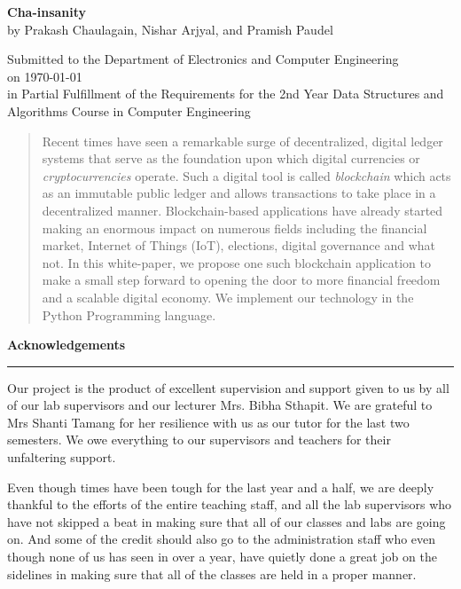 \documentclass[a4paper, 12pt]{article}
\newcommand\myemptypage{
		\null
		\thispagestyle{empty}
		\addtocounter{page}{-1}
		\newpage
}
\begin{document}
\myemptypage

\begin{center}
    {\large \textbf{Cha-insanity}}\\
    by 
    {Prakash Chaulagain, Nishar Arjyal, and Pramish Paudel}\\
    \vspace{0.2\baselineskip}
	\begin{spacing}{0.8}
	{Submitted to the Department of Electronics and Computer Engineering \\
	on \today \\ in Partial Fulfillment of the Requirements for the 2nd Year
	Data Structures and Algorithms Course in Computer Engineering}\\
	\end{spacing}    
\end{center}

\begin{abstract}
    Recent times have seen a remarkable surge of decentralized, digital ledger systems that serve as the foundation upon which digital currencies or \emph{cryptocurrencies} operate. Such a digital tool is called \emph{blockchain} which acts as an immutable public ledger and allows transactions to take place in a decentralized manner. Blockchain-based applications have already started making an enormous impact on numerous fields including the financial market, Internet of Things (IoT), elections, digital governance and what not. In this white-paper, we propose one such blockchain application to make a small step forward to opening the door to more financial freedom and a scalable digital economy. We implement our technology in the Python Programming language.
\end{abstract}

\newpage

\newpage
\begin{center}
	\textbf{\myfontsize Acknowledgements}
\end{center} 
\hrule 
\vspace{2\baselineskip}
\par
Our project is the product of excellent supervision and support given 
to us by all of our lab supervisors and our lecturer Mrs. Bibha Sthapit. We are grateful to Mrs Shanti Tamang for her resilience with 
us as our tutor for the last two semesters. We owe everything 
to our supervisors and teachers for their unfaltering support.
\par
Even though times have been tough for the last year and a half, we 
are deeply thankful to the efforts of the entire teaching staff, 
and all the lab supervisors who have not skipped a beat in making sure 
that all of our classes and labs are going on. And some of the 
credit should also go to the administration staff who even though none of 
us has seen in over a year, have quietly done a great job on the sidelines
in making sure that all of the classes are held in a proper manner.
\end{document}
